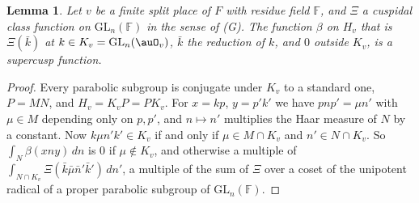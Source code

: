 \documentclass[10pt]{amsart}
\newtheorem{lemma}[theorem]{Lemma}
\theoremstyle{definition}
\theoremstyle{remark}
\providecommand{\auF}{\mathbb F}
\providecommand{\auGL}{\mathrm{GL}}
\begin{document}
\begin{lemma}\label{pm:supercusp}
Let $v$ be a finite split place of $F$ with residue field $\auF$, and $\Xi$ a cuspidal class
function on $\auGL_n(\auF)$ in the sense of \textup{(G)}. The function $\beta$ on $H_v$ that is
$\Xi(\bar k)$ at $k\in K_v=\auGL_n(\auO_v)$, $\bar k$ the reduction of $k$, and $0$ outside $K_v$, is
a supercusp function.
\end{lemma}
\begin{proof}
Every parabolic subgroup is conjugate under $K_v$ to a standard one, $P=MN$, and $H_v=K_vP=PK_v$.
For $x=kp$, $y=p'k'$ we have $pnp'=\mu n'$ with $\mu\in M$ depending only on $p,p'$, and $n\mapsto
n'$ multiplies the Haar measure of $N$ by a constant. Now $k\mu n'k'\in K_v$ if and only if
$\mu\in M\cap K_v$ and $n'\in N\cap K_v$. So $\int_N\beta(xny)\,dn$ is $0$ if $\mu\notin K_v$, and
otherwise a multiple of $\int_{N\cap K_v}\Xi(\bar k\bar\mu\bar n'\bar k')\,dn'$, a multiple of the
sum of $\Xi$ over a coset of the unipotent radical of a proper parabolic subgroup of
$\auGL_n(\auF)$.
\end{proof}
\end{document}
